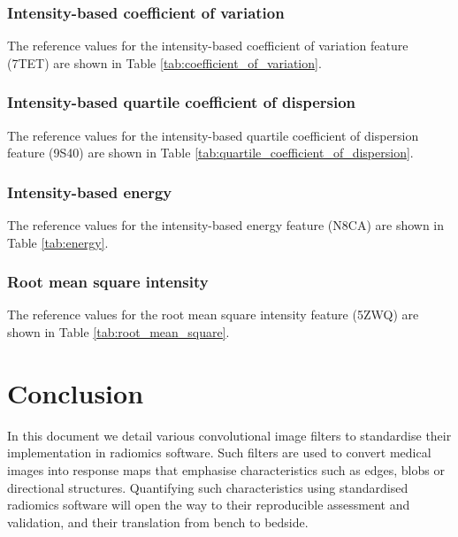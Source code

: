 \documentclass[fleqn,a4paper,oneside,openany]{book}
\newcommand\textid[1]{{\normalsize{\idfont #1}}}
\begin{document}
\subsection{Intensity-based coefficient of variation}
The reference values for the intensity-based coefficient of variation feature (\textid{7TET}) are shown in Table \ref{tab:coefficient_of_variation}.

\subsection{Intensity-based quartile coefficient of dispersion}
The reference values for the intensity-based quartile coefficient of dispersion feature (\textid{9S40}) are shown in Table \ref{tab:quartile_coefficient_of_dispersion}.

\begin{minipage}[l]{0.45\textwidth}

\end{minipage}
\quad
\begin{minipage}[r]{0.45\textwidth}

\end{minipage}
\FloatBarrier

\subsection{Intensity-based energy}
The reference values for the intensity-based energy feature (\textid{N8CA}) are shown in Table \ref{tab:energy}.

\subsection{Root mean square intensity}
The reference values for the root mean square intensity feature (\textid{5ZWQ}) are shown in Table \ref{tab:root_mean_square}.

\begin{minipage}[l]{0.45\textwidth}

\end{minipage}
\quad
\begin{minipage}[r]{0.45\textwidth}

\end{minipage}
\FloatBarrier

\chapter{Conclusion}
In this document we detail various convolutional image filters to standardise their implementation in radiomics software. Such filters are used to convert medical images into response maps that emphasise characteristics such as edges, blobs or directional structures. Quantifying such characteristics using standardised radiomics software will open the way to their reproducible assessment and validation, and their translation from bench to bedside.
\end{document}
